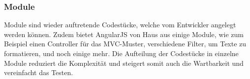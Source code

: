 \subsubsection{Module}

Module sind wieder auftretende Codestücke, welche vom Entwickler angelegt werden können. Zudem bietet AngularJS von Haus aus einige Module, wie zum Beispiel einen Controller für das MVC-Muster, verschiedene Filter, um Texte zu formatieren, und noch einige mehr. Die Aufteilung der Codestücke in einzelne Module reduziert die Komplexität und steigert somit auch die Wartbarkeit und vereinfacht das Testen.
%
%
